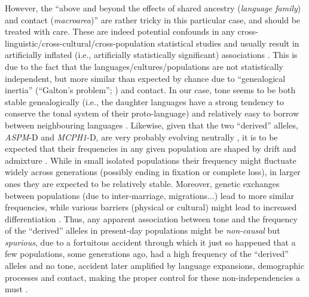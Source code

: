 \documentclass[twoside,onecolumn]{article}
\begin{document}
However, the ``above and beyond the effects of shared ancestry (\textit{language family}) and contact (\textit{macroarea})'' are rather tricky in this particular case, and should be treated with care.
These are indeed potential confounds in any cross-linguistic/cross-cultural/cross-population statistical studies and usually result in artificially inflated (i.e., artificially statistically significant) associations \citep{ladd_correlational_2015}.
This is due to the fact that the languages/cultures/populations are not statistically independent, but more similar than expected by chance due to ``genealogical inertia'' (``Galton's problem''; \citealp{mace_galtonproblem_1994}) and contact.
In our case, tone seems to be both stable genealogically (i.e., the daughter languages have a strong tendency to conserve the tonal system of their proto-language) and relatively easy to borrow between neighbouring languages \citep{yip_tone_2002,dediu_procb_2011,dediu_cysouw_2013,kauhanen_geospatial_2018,collins_tone_2016}.
Likewise, given that the two ``derived'' alleles, \textit{ASPM}-D and \textit{MCPH1}-D, are very probably evolving neutrally \citep{currat_comment_2006}, it is to be expected that their frequencies in any given population are shaped by drift and admixture \citep{jobling_human_2013}.
While in small isolated populations their frequency might fluctuate widely across generations (possibly ending in fixation or complete loss), in larger ones they are expected to be relatively stable.
Moreover, genetic exchanges between populations (due to inter-marriage, migrations...) lead to more similar frequencies, while various barriers (physical or cultural) might lead to increased differentiation \citep{jobling_human_2013,reich_who_2018}.
Thus, any apparent association between tone and the frequency of the ``derived'' alleles in present-day populations might be \emph{non-causal} but \emph{spurious}, due to a fortuitous accident through which it just so happened that a few populations, some generations ago, had a high frequency of the ``derived'' alleles and no tone, accident later amplified by language expansions, demographic processes and contact, making the proper control for these non-independencies a must \citep{roberts_traffic_2013,ladd_correlational_2015}.
\end{document}
